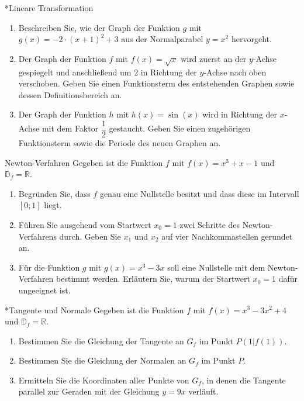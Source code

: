 \begin{uebung}*{Lineare Transformation}
\begin{enumerate}[label=\alph*)]
  \item Beschreiben Sie, wie der Graph der Funktion $g$ mit $g(x) = -2\cdot(x+1)^2+3$ aus der Normalparabel $y=x^2$ hervorgeht.
  \item Der Graph der Funktion $f$ mit $f(x) = \sqrt{x}$ wird zuerst an der $y$-Achse gespiegelt und anschließend um $2$ in Richtung der $y$-Achse nach oben verschoben. Geben Sie einen Funktionsterm des entstehenden Graphen sowie dessen Definitionsbereich an.
  \item Der Graph der Funktion $h$ mit $h(x) = \sin{(x)}$ wird in Richtung der $x$-Achse mit dem Faktor $\dfrac{1}{2}$ gestaucht. Geben Sie einen zugehörigen Funktionsterm sowie die Periode des neuen Graphen an.
\end{enumerate}
\end{uebung}

\begin{uebung}{Newton-Verfahren}
Gegeben ist die Funktion $f$ mit $f(x) = x^3+x-1$ und $\mathds{D}_f = \mathds{R}$.
\begin{enumerate}[label=\alph*)]
  \item Begründen Sie, dass $f$ genau eine Nullstelle besitzt und dass diese im Intervall $[0;1]$ liegt.
  \item Führen Sie ausgehend vom Startwert $x_0 = 1$ zwei Schritte des Newton-Verfahrens durch. Geben Sie $x_1$ und $x_2$ auf vier Nachkommastellen gerundet an.
  \item Für die Funktion $g$ mit $g(x)= x^3-3x$ soll eine Nullstelle mit dem Newton-Verfahren bestimmt werden. Erläutern Sie, warum der Startwert $x_0 = 1$ dafür ungeeignet ist.
\end{enumerate}
\end{uebung}


\begin{uebung}*{Tangente und Normale}
Gegeben ist die Funktion $f$ mit $f(x) = x^3-3x^2+4$ und $\mathds{D}_f = \mathds{R}$.
\begin{enumerate}[label=\alph*)]
  \item Bestimmen Sie die Gleichung der Tangente an $G_f$ im Punkt $P(1|f(1))$.
  \item Bestimmen Sie die Gleichung der Normalen an $G_f$ im Punkt $P$.
  \item Ermitteln Sie die Koordinaten aller Punkte von $G_f$, in denen die Tangente parallel zur Geraden mit der Gleichung $y = 9x$ verläuft.
\end{enumerate}
\end{uebung}

